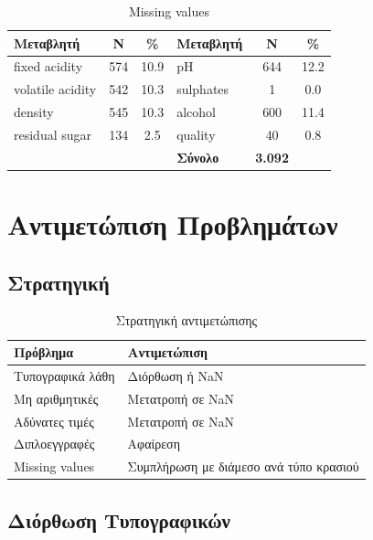\documentclass[12pt,a4paper]{article}
\begin{document}
\begin{table}[H]
\centering
\caption{Missing values}
\begin{tabular}{lcc|lcc}
\toprule
\textbf{\textgreek{Μεταβλητή}} & \textbf{N} & \textbf{\%} & \textbf{\textgreek{Μεταβλητή}} & \textbf{N} & \textbf{\%} \\
\midrule
fixed acidity & 574 & 10.9 & pH & 644 & 12.2 \\
volatile acidity & 542 & 10.3 & sulphates & 1 & 0.0 \\
density & 545 & 10.3 & alcohol & 600 & 11.4 \\
residual sugar & 134 & 2.5 & quality & 40 & 0.8 \\
\midrule
\multicolumn{3}{c}{} & \textbf{\textgreek{Σύνολο}} & \textbf{3.092} & \\
\bottomrule
\end{tabular}
\end{table}

\section{\textgreek{Αντιμετώπιση Προβλημάτων}}

\subsection{\textgreek{Στρατηγική}}

\begin{table}[H]
\centering
\caption{\textgreek{Στρατηγική αντιμετώπισης}}
\begin{tabular}{lp{7cm}}
\toprule
\textbf{\textgreek{Πρόβλημα}} & \textbf{\textgreek{Αντιμετώπιση}} \\
\midrule
\textgreek{Τυπογραφικά λάθη} & \textgreek{Διόρθωση ή NaN} \\
\textgreek{Μη αριθμητικές} & \textgreek{Μετατροπή σε NaN} \\
\textgreek{Αδύνατες τιμές} & \textgreek{Μετατροπή σε NaN} \\
\textgreek{Διπλοεγγραφές} & \textgreek{Αφαίρεση} \\
Missing values & \textgreek{Συμπλήρωση με διάμεσο ανά τύπο κρασιού} \\
\bottomrule
\end{tabular}
\end{table}

\subsection{\textgreek{Διόρθωση Τυπογραφικών}}
\end{document}
